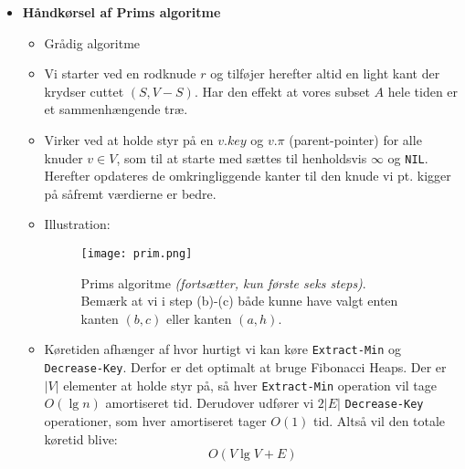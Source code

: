\begin{itemize}
\newpage
\item \textbf{Håndkørsel af Prims algoritme}
\begin{itemize}
	\item Grådig algoritme
	\item Vi starter ved en rodknude $r$ og tilføjer herefter altid en light kant der krydser cuttet $(S, V-S)$. Har den effekt at vores subset $A$ hele tiden er et sammenhængende træ.
	\item Virker ved at holde styr på en $v.key$ og $v.\pi$ (parent-pointer) for alle knuder $v \in V$, som til at starte med sættes til henholdsvis $\infty$ og \texttt{NIL}. Herefter opdateres de omkringliggende kanter til den knude vi pt. kigger på såfremt værdierne er bedre.
	\item Illustration:
	\begin{figure}[H]
		\begin{center}
			\texttt{[image: prim.png]}
		\end{center}
		\caption{Prims algoritme \textit{(fortsætter, kun første seks steps)}.\\
			Bemærk at vi i step (b)-(c) både kunne have valgt enten kanten $(b, c)$ eller kanten $(a, h)$.}
		\label{fig:prim}
	\end{figure}
	\item Køretiden afhænger af hvor hurtigt vi kan køre \texttt{Extract-Min} og \texttt{Decrease-Key}. Derfor er det optimalt at bruge Fibonacci Heaps. Der er $|V|$ elementer at holde styr på, så hver \texttt{Extract-Min} operation vil tage $O(\lg n)$ amortiseret tid. Derudover udfører vi $2 |E|$ \texttt{Decrease-Key} operationer, som hver amortiseret tager $O(1)$ tid. Altså vil den totale køretid blive:
	$$
	O(V \lg V + E)
	$$
\end{itemize}



\end{itemize}
